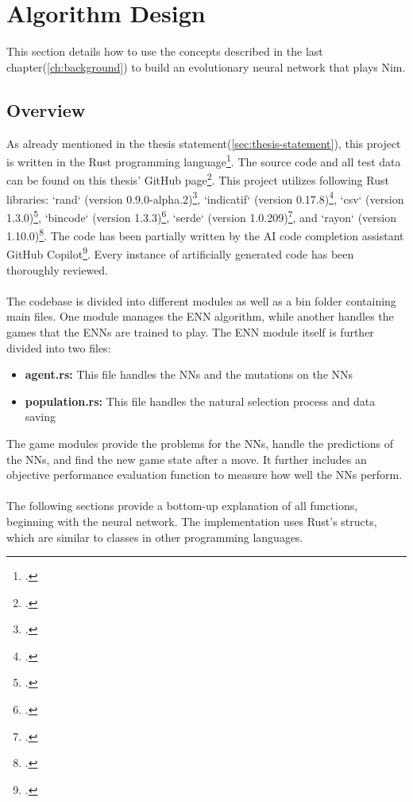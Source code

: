 \section{Algorithm Design}\label{sec:algorithm-design}
This section details how to use the concepts described in the last chapter(\ref{ch:background}) to build an evolutionary neural network that plays Nim.

\subsection{Overview}\label{subsec:overview}
As already mentioned in the thesis statement(\ref{sec:thesis-statement}), this project is written in the Rust programming language\footcite{rust, rust23}.
The source code and all test data can be found on this thesis' GitHub page\footcite{RustENN}.
This project utilizes following Rust libraries:
`rand` (version 0.9.0-alpha.2)\footcite{rand2024},
`indicatif` (version 0.17.8)\footcite{indicatif2023},
`csv` (version 1.3.0)\footcite{csv2023},
`bincode` (version 1.3.3)\footcite{bincode2021},
`serde` (version 1.0.209)\footcite{serde2024},
and `rayon` (version 1.10.0)\footcite{rayon2023}.
The code has been partially written by the AI code completion assistant GitHub Copilot\footcite{github_copilot2021}.
Every instance of artificially generated code has been thoroughly reviewed.
\\ \\
The codebase is divided into different modules as well as a bin folder containing main files.
One module manages the ENN algorithm, while another handles the games that the ENNs are trained to play.
The ENN module itself is further divided into two files:
\begin{itemize}
    \item \textbf{agent.rs:} This file handles the NNs and the mutations on the NNs
    \item \textbf{population.rs:} This file handles the natural selection process and data saving
\end{itemize}
The game modules provide the problems for the NNs, handle the predictions of the NNs, and find the new game state after a move.
It further includes an objective performance evaluation function to measure how well the NNs perform.
\\ \\
The following sections provide a bottom-up explanation of all functions, beginning with the neural network.
The implementation uses Rust's structs, which are similar to classes in other programming languages.

